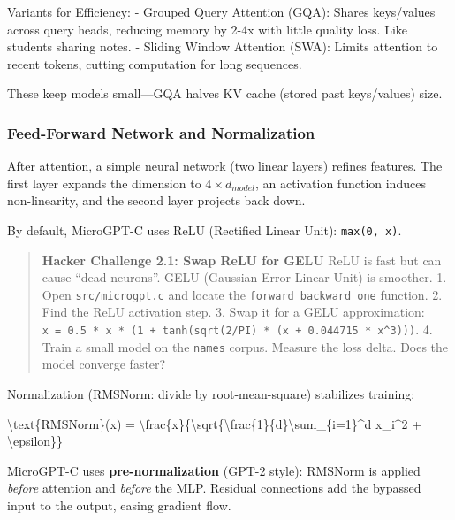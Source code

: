 \documentclass[
]{article}
\newenvironment{Shaded}{}{}
\newcommand{\NormalTok}[1]{#1}
\begin{document}
Variants for Efficiency: - Grouped Query Attention (GQA): Shares
keys/values across query heads, reducing memory by 2-4x with little
quality loss. Like students sharing notes. - Sliding Window Attention
(SWA): Limits attention to recent tokens, cutting computation for long
sequences.

These keep models small---GQA halves KV cache (stored past keys/values)
size.

\subsubsection{Feed-Forward Network and
Normalization}\label{feed-forward-network-and-normalization}

After attention, a simple neural network (two linear layers) refines
features. The first layer expands the dimension to
\(4 \times d_{model}\), an activation function induces non-linearity,
and the second layer projects back down.

By default, MicroGPT-C uses ReLU (Rectified Linear Unit):
\texttt{max(0,\ x)}.

\begin{quote}
\textbf{Hacker Challenge 2.1: Swap ReLU for GELU} ReLU is fast but can
cause ``dead neurons''. GELU (Gaussian Error Linear Unit) is smoother.
1. Open \texttt{src/microgpt.c} and locate the
\texttt{forward\_backward\_one} function. 2. Find the ReLU activation
step. 3. Swap it for a GELU approximation:
\texttt{x\ =\ 0.5\ *\ x\ *\ (1\ +\ tanh(sqrt(2/PI)\ *\ (x\ +\ 0.044715\ *\ x\^{}3)))}.
4. Train a small model on the \texttt{names} corpus. Measure the loss
delta. Does the model converge faster?
\end{quote}

Normalization (RMSNorm: divide by root-mean-square) stabilizes training:

\begin{Shaded}
\begin{Highlighting}[]
\NormalTok{\textbackslash{}text\{RMSNorm\}(x) = \textbackslash{}frac\{x\}\{\textbackslash{}sqrt\{\textbackslash{}frac\{1\}\{d\}\textbackslash{}sum\_\{i=1\}\^{}d x\_i\^{}2 + \textbackslash{}epsilon\}\}}
\end{Highlighting}
\end{Shaded}

MicroGPT-C uses \textbf{pre-normalization} (GPT-2 style): RMSNorm is
applied \emph{before} attention and \emph{before} the MLP. Residual
connections add the bypassed input to the output, easing gradient flow.
\end{document}
